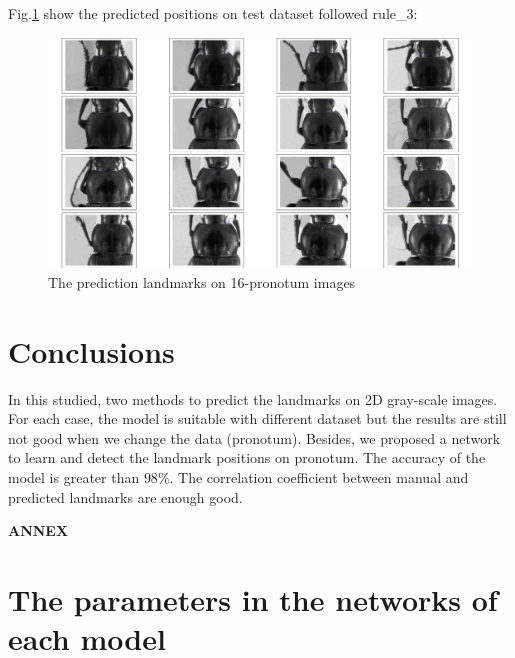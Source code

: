 \documentclass[12pt,a4paper]{article}
\begin{document}
Fig.\ref{cnn3t} show the predicted positions on test dataset followed rule\_3:
\begin{figure}[h!]
	\centering
	\includegraphics[scale=0.2]{images/figure_1_cnn3_5000_v13}
	\caption{The prediction landmarks on 16-pronotum images}
	\label{cnn3t}
\end{figure}
\section{Conclusions}
In this studied, two methods to predict the landmarks on 2D gray-scale images. For each case, the model is suitable with different dataset but the results are still not good when we change the data (pronotum). Besides, we proposed a network to learn and detect the landmark positions on pronotum. The accuracy of the model is greater than $98 \%$. The correlation coefficient between manual and predicted landmarks are enough good.



\pagebreak
\appendix
\begin{center}
\LARGE \textbf{ANNEX}
\end{center}
\section{The parameters in the networks of each model}
\end{document}
